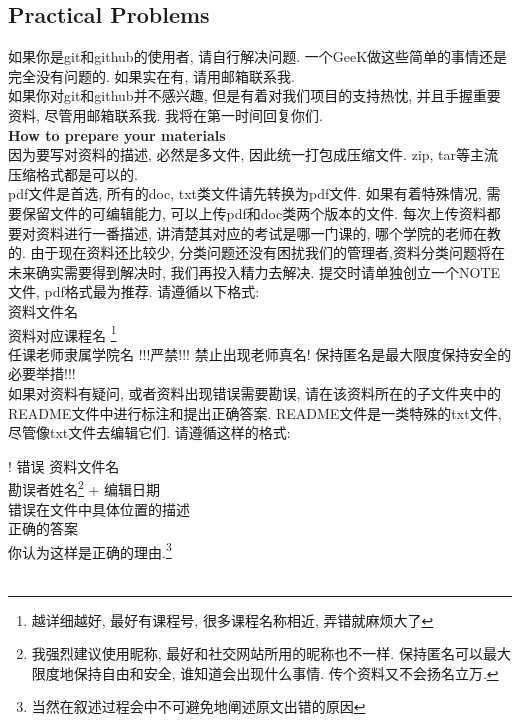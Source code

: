 \documentclass{article}
\begin{document}
\begin{spacing}{1.5}
\subsection{Practical Problems}
如果你是git和github的使用者, 请自行解决问题. 一个GeeK做这些简单的事情还是完全没有问题的. 如果实在有, 请用邮箱联系我.\\
如果你对git和github并不感兴趣, 但是有着对我们项目的支持热忱, 并且手握重要资料, 尽管用邮箱联系我. 我将在第一时间回复你们. \\
\textbf{How to prepare your materials} \\
因为要写对资料的描述, 必然是多文件, 因此统一打包成压缩文件. zip, tar等主流压缩格式都是可以的. \\
pdf文件是首选, 所有的doc, txt类文件请先转换为pdf文件. 如果有着特殊情况, 需要保留文件的可编辑能力, 可以上传pdf和doc类两个版本的文件. 每次上传资料都要对资料进行一番描述, 讲清楚其对应的考试是哪一门课的, 哪个学院的老师在教的. 由于现在资料还比较少, 分类问题还没有困扰我们的管理者,资料分类问题将在未来确实需要得到解决时, 我们再投入精力去解决. 提交时请单独创立一个NOTE文件, pdf格式最为推荐. 请遵循以下格式: \\

\noindent 资料文件名 \\
 资料对应课程名 \footnote[1]{越详细越好, 最好有课程号, 很多课程名称相近, 弄错就麻烦大了} \\
 任课老师隶属学院名 !!!严禁!!! 禁止出现老师真名! 保持匿名是最大限度保持安全的必要举措!!! \\



如果对资料有疑问, 或者资料出现错误需要勘误, 请在该资料所在的子文件夹中的README文件中进行标注和提出正确答案. README文件是一类特殊的txt文件, 尽管像txt文件去编辑它们. 请遵循这样的格式:\\

\end{spacing}
\noindent! 错误 资料文件名  \\
 勘误者姓名\footnote[2]{我强烈建议使用昵称, 最好和社交网站所用的昵称也不一样. 保持匿名可以最大限度地保持自由和安全, 谁知道会出现什么事情. 传个资料又不会扬名立万.} + 编辑日期  \\
 错误在文件中具体位置的描述  \\
 正确的答案  \\
 你认为这样是正确的理由.\footnote[3]{当然在叙述过程会中不可避免地阐述原文出错的原因} \\
\\
\end{document}
